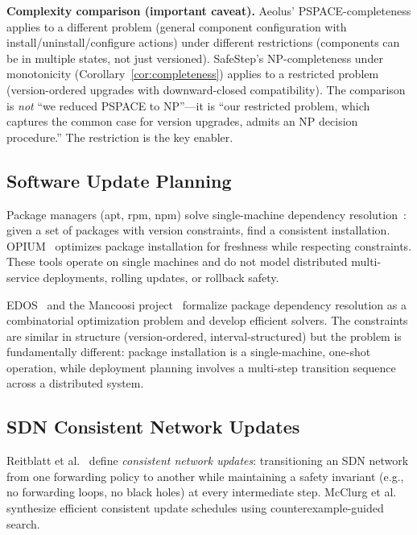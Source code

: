 \documentclass[10pt,twocolumn]{article}
\begin{document}
\textbf{Complexity comparison (important caveat).} Aeolus' PSPACE-completeness applies to a different problem (general component configuration with install/uninstall/configure actions) under different restrictions (components can be in multiple states, not just versioned). SafeStep's NP-completeness under monotonicity (Corollary~\ref{cor:completeness}) applies to a restricted problem (version-ordered upgrades with downward-closed compatibility). The comparison is \emph{not} ``we reduced PSPACE to NP''---it is ``our restricted problem, which captures the common case for version upgrades, admits an NP decision procedure.'' The restriction is the key enabler.

\subsection{Software Update Planning}
\label{sec:related-update}

Package managers (apt, rpm, npm) solve single-machine dependency resolution~\cite{mancinelli2006managing}: given a set of packages with version constraints, find a consistent installation. OPIUM~\cite{tucker2007opium} optimizes package installation for freshness while respecting constraints. These tools operate on single machines and do not model distributed multi-service deployments, rolling updates, or rollback safety.

EDOS~\cite{dicosmo2006edos} and the Mancoosi project~\cite{abate2012dependency} formalize package dependency resolution as a combinatorial optimization problem and develop efficient solvers. The constraints are similar in structure (version-ordered, interval-structured) but the problem is fundamentally different: package installation is a single-machine, one-shot operation, while deployment planning involves a multi-step transition sequence across a distributed system.

\subsection{SDN Consistent Network Updates}
\label{sec:related-sdn}

Reitblatt et al.~\cite{reitblatt2012consistent} define \emph{consistent network updates}: transitioning an SDN network from one forwarding policy to another while maintaining a safety invariant (e.g., no forwarding loops, no black holes) at every intermediate step. McClurg et al.~\cite{mcclurg2015efficient} synthesize efficient consistent update schedules using counterexample-guided search.
\end{document}
